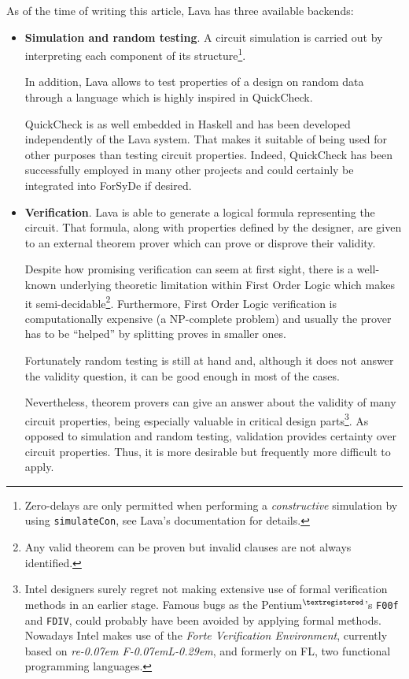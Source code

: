 \documentclass[a4paper,twoside,11pt]{article}
\newcommand{\reFLect}{\textit{re\kern-0.07em
    F\kern-0.07emL\kern-0.29em\raisebox{0.56ex}{ect}}\xspace}
\begin{document}
\begin{body}
As of the time of writing this article, Lava has three available backends:

\begin{itemize}
\item \textbf{Simulation and random testing}. A circuit simulation
  is carried out by interpreting each component of its
  structure\footnote{Zero-delays are only permitted when performing a
    \textit{constructive} simulation by using \texttt{simulateCon},
    see Lava's documentation\cite{lava:thesis} for details.}.

  In addition, Lava allows to test properties of a
  design on random data through a language which is highly inspired in
  \textsf{QuickCheck}\cite{quickcheck}.
  
  \textsf{QuickCheck} is as well embedded in Haskell and has been
  developed independently of the Lava system. That makes it suitable
  of being used for other purposes than testing circuit properties.
  Indeed, \textsf{QuickCheck} has been successfully employed in many
  other projects and could certainly be integrated into ForSyDe if
  desired.

\item \textbf{Verification}. Lava is able to generate a logical
  formula representing the circuit. That formula, along with
  properties defined by the designer, are given to an external theorem
  prover which can prove or disprove their validity.
  
  Despite how promising verification can seem at first sight, there is
  a well-known underlying theoretic limitation within First Order
  Logic which makes it semi-decidable\footnote{Any valid theorem can
    be proven but invalid clauses are not always identified.}.
  Furthermore, First Order Logic verification is computationally
  expensive (a NP-complete problem) and usually the prover has to be
  ``helped'' by splitting proves in smaller ones.
  
  Fortunately random testing is still at hand and, although it does
  not answer the validity question, it can be good enough in most of
  the cases.
  
  Nevertheless, theorem provers can give an answer about the validity
  of many circuit properties, being especially valuable in critical
  design parts\footnote{Intel designers surely regret not making
  extensive use of formal verification methods in an earlier stage.
  Famous bugs as the Pentium{\tiny $^{\textregistered}$}'s
  \texttt{F00f}\cite{f00f} and \texttt{FDIV}\cite{fdiv}, could
  probably have been avoided by applying formal methods. Nowadays
  Intel makes use of the \textit{Forte Verification
  Environment}\cite{forte}, currently based on
  \reFLect{\cite{reflect}}, and formerly on FL\cite{fl}, two
  functional programming languages.}. As opposed to simulation and
  random testing, validation provides certainty over circuit
  properties. Thus, it is more desirable but frequently more difficult
  to apply.


\end{itemize}
\end{body}
\end{document}
